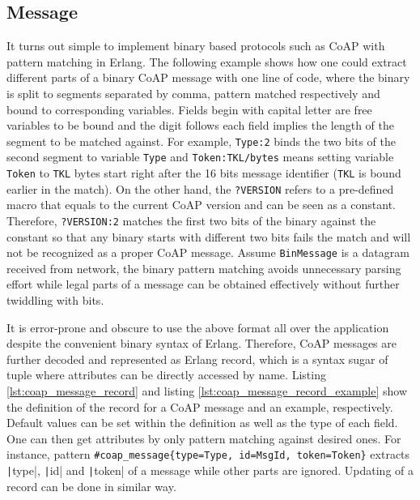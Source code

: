 \subsection{Message}

It turns out simple to implement binary based protocols such as CoAP with pattern matching in Erlang. The following example shows how one could extract different parts of a binary CoAP message with one line of code, where the binary is split to segments separated by comma, pattern matched respectively and bound to corresponding variables. Fields begin with capital letter are free variables to be bound and the digit follows each field implies the length of the segment to be matched against. For example, \verb|Type:2| binds the two bits of the second segment to variable \verb|Type| and \verb|Token:TKL/bytes| means setting variable \verb|Token| to \verb|TKL| bytes start right after the 16 bits message identifier (\verb|TKL| is bound earlier in the match). On the other hand, the \verb|?VERSION| refers to a pre-defined macro that equals to the current CoAP version and can be seen as a constant. Therefore, \verb|?VERSION:2| matches the first two bits of the binary against the constant so that any binary starts with different two bits fails the match and will not be recognized as a proper CoAP message. Assume \verb|BinMessage| is a datagram received from network, the binary pattern matching avoids unnecessary parsing effort while legal parts of a message can be obtained effectively without further twiddling with bits. 


It is error-prone and obscure to use the above format all over the application despite the convenient binary syntax of Erlang. Therefore, CoAP messages are further decoded and represented as Erlang record, which is a syntax sugar of tuple where attributes can be directly accessed by name. Listing \ref{lst:coap_message_record} and listing \ref{lst:coap_message_record_example} show the definition of the record for a CoAP message and an example, respectively. Default values can be set within the definition as well as the type of each field. One can then get attributes by only pattern matching against desired ones. For instance, pattern \verb|#coap_message{type=Type, id=MsgId, token=Token}| extracts \texttt|type|, \texttt|id| and \texttt|token| of a message while other parts are ignored. Updating of a record can be done in similar way. 

